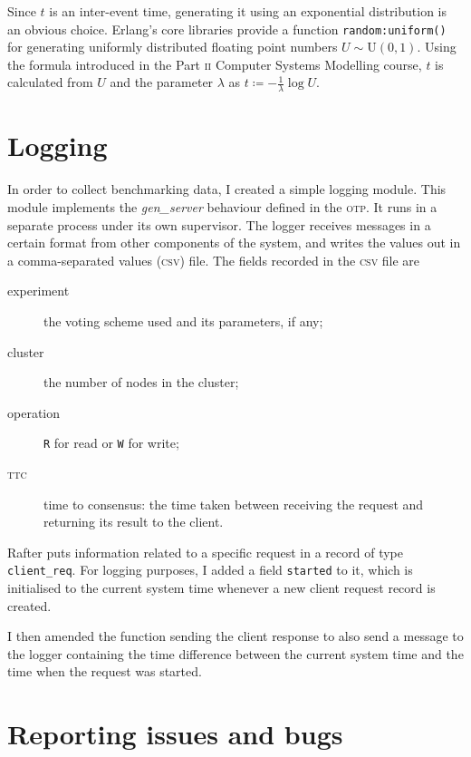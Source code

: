 \documentclass[11pt,chapterprefix=true,toc=bibliography,numbers=noendperiod,
               footnotes=multiple,twoside]{scrreprt}
\begin{document}
Since \(t\) is an inter-event time, generating it using an exponential distribution is an obvious choice. Erlang's core libraries provide a function \texttt{random:uniform()} for generating uniformly distributed floating point numbers \(U \sim \text{U}(0,1)\). Using the formula introduced in the Part \textsc{ii} Computer Systems Modelling course, \(t\) is calculated from \(U\) and the parameter \(\lambda\) as \(t \coloneqq -\frac{1}{\lambda}\log{U}\).

\section{Logging}

In order to collect benchmarking data, I created a simple logging module. This module implements the \emph{gen\_server} behaviour defined in the \textsc{otp}. It runs in a separate process under its own supervisor. The logger receives messages in a certain format from other components of the system, and writes the values out in a comma-separated values (\textsc{csv}) file. The fields recorded in the \textsc{csv} file are

\begin{description}
    \item[experiment] the voting scheme used and its parameters, if any;
    \item[cluster] the number of nodes in the cluster;
    \item[operation] \texttt{R} for read or \texttt{W} for write;
    \item[\textsc{ttc}] time to consensus: the time taken between receiving the request and returning its result to the client.
\end{description}

Rafter puts information related to a specific request in a record of type \texttt{client\_req}. For logging purposes, I added a field \texttt{started} to it, which is initialised to the current system time whenever a new client request record is created.

I then amended the function sending the client response to also send a message to the logger containing the time difference between the current system time and the time when the request was started.

\section{Reporting issues and bugs}
\end{document}

